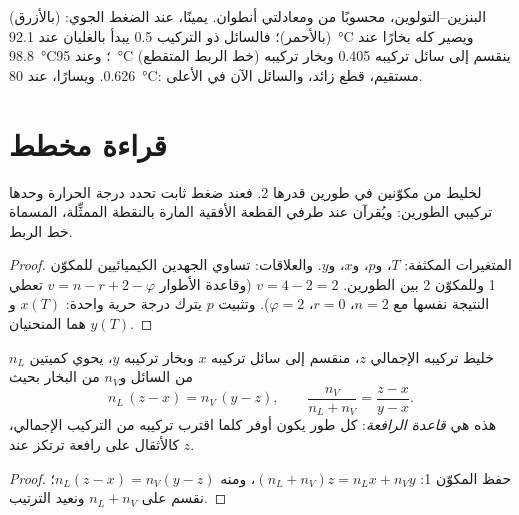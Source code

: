 \begin{omfigure}
{\small البنزين--التولوين، محسوبًا من  ومعادلتي
أنطوان. يمينًا، عند الضغط الجوي:  (بالأزرق) 
(بالأحمر)؛ فالسائل ذو التركيب 0.5 يبدأ بالغليان عند
\qty{92.1}{\degreeCelsius} ويصير كله بخارًا عند \qty{98.8}{\degreeCelsius}؛ وعند
\qty{95}{\degreeCelsius} (خط الربط المتقطع) ينقسم إلى سائل تركيبه 0.405
وبخار تركيبه 0.626. ويسارًا، عند \qty{80}{\degreeCelsius}: 
مستقيم،  قطع زائد، والسائل الآن في الأعلى.}
\end{omfigure}

\section{قراءة مخطط}

\begin{proposition}\label{prop:b2:liquid-vapour-diagrams:variance}
لخليط من مكوّنين في طورين  قدرها 2. فعند ضغط ثابت
تحدد درجة الحرارة وحدها تركيبي الطورين: ويُقرآن
عند طرفي القطعة الأفقية المارة بالنقطة الممثِّلة،
المسماة خط الربط.
\end{proposition}

\begin{proof}
المتغيرات المكثفة: $T$، و$p$، و$x$، و$y$. والعلاقات: تساوي الجهدين
الكيميائيين للمكوّن 1 وللمكوّن 2 بين الطورين. $v = 4 - 2 = 2$ (وقاعدة الأطوار
$v = n - r + 2 - \varphi$ تعطي النتيجة نفسها مع $n = 2$، $r = 0$، $\varphi = 2$).
وتثبيت $p$ يترك درجة حرية واحدة: $x(T)$ و$y(T)$ هما المنحنيان.
\end{proof}

\begin{theorem}\label{thm:b2:liquid-vapour-diagrams:lever}
خليط تركيبه الإجمالي $z$، منقسم إلى سائل تركيبه $x$
وبخار تركيبه $y$، يحوي كميتين $n_L$ من السائل و$n_V$ من
البخار بحيث
\[
  n_L\,(z - x) = n_V\,(y - z), \qquad \frac{n_V}{n_L + n_V} = \frac{z - x}{y - x} .
\]
هذه هي \emph{قاعدة الرافعة}: كل طور يكون أوفر
كلما اقترب تركيبه من التركيب الإجمالي، كالأثقال على
رافعة ترتكز عند $z$.
\end{theorem}

\begin{proof}
حفظ المكوّن 1: $(n_L + n_V)z = n_Lx + n_Vy$، ومنه $n_L(z - x) =
n_V(y - z)$؛ نقسم على $n_L + n_V$ ونعيد الترتيب.
\end{proof}


